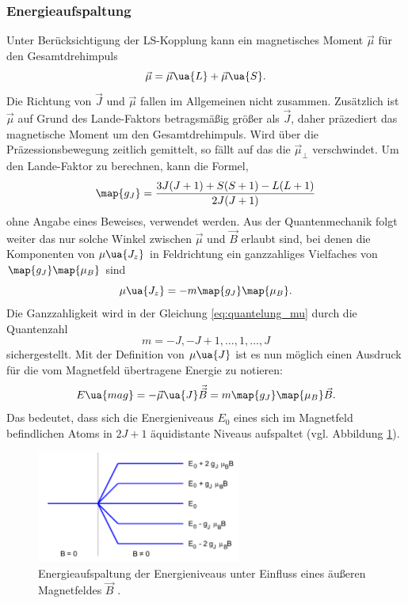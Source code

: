 \subsubsection{Energieaufspaltung}
Unter Berücksichtigung der LS-Kopplung kann ein magnetisches Moment $\vec{\mu}$ für den Gesamtdrehimpuls
\begin{equation*}
  \vec{\mu}=\vec{\mu}\ua{L} + \vec{\mu}\ua{S}.
\end{equation*}
Die Richtung von $\vec{J}$ und $\vec{\mu}$ fallen im Allgemeinen nicht zusammen. Zusätzlich ist
$\vec{\mu}$ auf Grund des Lande-Faktors betragsmäßig größer als $\vec{J}$, daher präzediert das magnetische Moment um den Gesamtdrehimpuls.
Wird über die Präzessionsbewegung zeitlich gemittelt, so fällt auf das die $\vec{\mu}_{\perp}$ verschwindet.
Um den Lande-Faktor zu berechnen, kann die Formel,
\begin{equation}
  \label{eq:lande_faktor}
  \map{g_J}=\frac{3J(J+1)+S(S+1)-L(L+1)}{2J(J+1)}
\end{equation}
ohne Angabe eines Beweises, verwendet werden.
Aus der Quantenmechanik folgt weiter das nur solche Winkel zwischen $\vec{\mu}$ und
$\vec{B}$ erlaubt sind, bei denen die Komponenten von $\mu\ua{J_z}$ in Feldrichtung ein ganzzahliges Vielfaches von
$\map{g_J}\map{\mu_B}$ sind
\begin{equation}
  \label{eq:quantelung_mu}
  \mu\ua{J_z}=-m\map{g_J}\map{\mu_B}.
\end{equation}
Die Ganzzahligkeit wird in der Gleichung \eqref{eq:quantelung_mu} durch die Quantenzahl
\begin{equation*}
m=-J,-J+1,\dots,1,\dots, J
\end{equation*}
sichergestellt.
Mit der Definition von $\mu\ua{J}$ ist es nun möglich einen Ausdruck für die vom Magnetfeld übertragene Energie
zu notieren:
\begin{equation}
  \label{eq:energie_mag}
  E\ua{mag}=-\vec{\mu}\ua{J}\vec{\vec{B}}=m\map{g_J}\map{\mu_B}\vec{B}.
\end{equation}
Das bedeutet, dass sich die Energieniveaus $E_0$ eines sich im Magnetfeld befindlichen Atoms
in $2J+1$ äquidistante Niveaus aufspaltet (vgl. Abbildung \ref{fig: energie_magnet}).
\FloatBarrier
\begin{figure}[h]
  \centering
  \includegraphics[width=0.6\textwidth]{pics/energieaufspaltung_magnetfeld.png}
  \caption{Energieaufspaltung der Energieniveaus unter Einfluss eines äußeren Magnetfeldes $\vec{B}$ \cite{anleitung27}.}
  \label{fig: energie_magnet}
\end{figure}
\FloatBarrier

